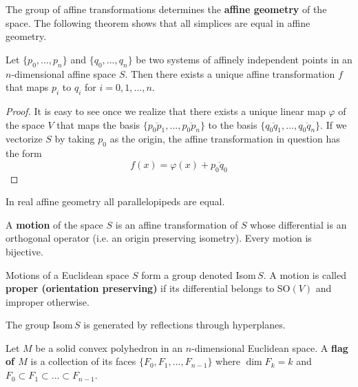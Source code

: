   The group of affine transformations determines the \textbf{affine geometry} of the space. The following theorem shows that all simplices are equal in affine geometry. 

  \begin{theorem}
    Let $\{p_0, ..., p_n\}$ and $\{q_0, ..., q_n\}$ be two systems of affinely independent points in an $n$-dimensional affine space $S$. Then there exists a unique affine transformation $f$ that maps $p_i$ to $q_i$ for $i = 0, 1, ..., n$. 
  \end{theorem}
  \begin{proof}
    It is easy to see once we realize that there exists a unique linear map $\varphi$ of the space $V$ that maps the basis $\{\overline{p_0 p_1}, ..., \overline{p_0 p_n}\}$ to the basis $\{\overline{q_0 q_1}, ..., \overline{q_0 q_n}\}$. If we vectorize $S$ by taking $p_0$ as the origin, the affine transformation in question has the form 
    \begin{equation}
      f(x) = \varphi(x) + \overline{p_0 q_0}
    \end{equation}
  \end{proof}

  \begin{corollary}
    In real affine geometry all parallelopipeds are equal. 
  \end{corollary}

  \begin{definition}
    A \textbf{motion} of the space $S$ is an affine transformation of $S$ whose differential is an orthogonal operator (i.e. an origin preserving isometry). Every motion is bijective. 
  \end{definition}

  Motions of a Euclidean space $S$ form a group denoted Isom$\,S$. A motion is called \textbf{proper (orientation preserving)} if its differential belongs to SO$(V)$ and improper otherwise. 

  \begin{lemma}
    The group Isom$\,S$ is generated by reflections through hyperplanes. 
  \end{lemma}

  \begin{definition}
    Let $M$ be a solid convex polyhedron in an $n$-dimensional Euclidean space. A \textbf{flag of $M$} is a collection of its faces $\{F_0, F_1, ..., F_{n-1}\}$ where $\dim{F_k} = k$ and $F_0 \subset F_1 \subset ... \subset F_{n-1}$. 
  \end{definition}


